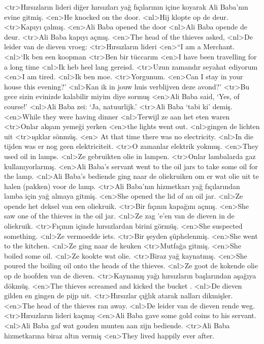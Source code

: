 <tr>Hırsızların lideri diğer hırsızları yağ fıçılarının içine  koyarak Ali Baba’nın evine gitmiş.
<en>He knocked on the  door. 
<nl>Hij klopte op de deur. 
<tr>Kapıyı çalmış.
<en>Ali Baba opened the door
<nl>Ali Baba opende de deur.
<tr>Ali Baba kapıyı açmış.
<en>The head of the thieves asked, 
<nl>De leider van de dieven vroeg:
<tr>Hırsızların lideri
<en>“I am a Merchant. 
<nl>`Ik ben een koopman 
<tr>Ben bir tüccarım
<en>I have been travelling for a long time 
<nl>Ik heb heel lang gereisd. 
<tr>Uzun zamandır seyahat ediyorum
<en>I am tired. 
<nl>Ik ben moe. 
<tr>Yorgunum.
<en>Can I stay in your house this evening?' 
<nl>Kan ik in jouw huis verblijven deze avond?'
<tr>Bu gece sizin evinizde kalabilir miyim diye sormuş
<en>Ali Baba said, `Yes, of course!' 
<nl>Ali Baba zei: `Ja, natuurlijk.' 
<tr>Ali Baba ‘tabi ki’ demiş.
<en>While they were  having dinner 
<nl>Terwijl ze aan het eten waren 
<tr>Onlar akşam yemeği yerken 
<en>the lights went out. 
<nl>gingen de lichten uit
<tr>ışıklar sönmüş.
<en> At that time there was no electricity. 
<nl>In die tijden was er nog geen elektriciteit.
<tr>O zamanlar elektrik yokmuş.
<en>They used oil in lamps. 
<nl>Ze gebruikten olie in lampen.
<tr>Onlar  lambalarda gaz  kullanıyorlarmış.
<en>Ali Baba’s servant went to the oil jars to take some oil for the lamp. 
<nl>Ali Baba's bediende ging naar de oliekruiken om er  wat olie uit te halen (pakken) voor de lamp. 
<tr>Ali Baba’nın hizmetkarı yağ fıçılarından lamba için yağ almaya gitmiş.
<en>She opened the lid of an oil jar. 
<nl>Ze opende het deksel van een oliekruik.
<tr>Bir fıçının kapağını açmış.
<en>She saw one of the thieves in the oil jar. 
<nl>Ze zag 'e'en van de dieven in de oliekruik. 
<tr>Fıçının içinde hırsızlardan birini görmüş.
<en>She suspected something. 
<nl>Ze vermoedde iets. 
<tr>Bir şeyden şüphelenmiş.
<en>She went to the kitchen.
<nl>Ze ging naar de keuken
<tr>Mutfağa gitmiş.
<en>She boiled some oil. 
<nl>Ze kookte wat olie. 
<tr>Biraz yağ kaynatmış.
<en>She poured the boiling oil onto the heads of the thieves.
<nl>Ze goot de kokende olie op de hoofden van de dieven. 
<tr>Kaynamış yağı hırsızların başlarından aşağıya dökmüş.
<en>The thieves screamed and kicked the bucket . 
<nl>De dieven gilden en gingen de pijp uit.
<tr>Hırsızlar çığlık atarak nalları dikmişler.
<en>The head of the thieves ran away. 
<nl>De leider van de dieven rende weg. 
<tr>Hırsızların lideri kaçmış
<en>Ali Baba gave some gold coins to his servant.
<nl>Ali Baba gaf wat gouden munten aan zijn bediende.
<tr>Ali Baba hizmetkarına biraz altın vermiş
<en>They lived happily ever after.
